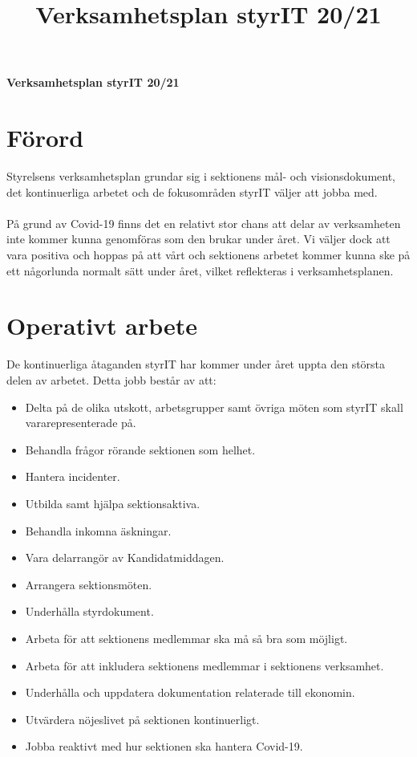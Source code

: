\documentclass[11pt, noincludeaddress, nopagination]{classes/cthit}
\newcommand{\kommitte}{styrIT 20/21}
\begin{document}
\title{Verksamhetsplan \kommitte{}}
\authors{\kommitte}
\makeheadfoot%
\begin{center}
    \Huge{\textbf{Verksamhetsplan \kommitte{} }}
\end{center}


\section{Förord}
Styrelsens verksamhetsplan grundar sig i sektionens mål- och visionsdokument, det kontinuerliga arbetet och de fokusområden styrIT väljer att jobba med.
\\\\
På grund av Covid-19 finns det en relativt stor chans att delar av verksamheten inte kommer kunna genomföras som den brukar under året. Vi väljer dock att vara positiva och hoppas på att vårt och sektionens arbetet kommer kunna ske på ett någorlunda normalt sätt under året, vilket reflekteras i verksamhetsplanen.
\section{Operativt arbete}
De kontinuerliga åtaganden styrIT har kommer under året uppta den största delen av arbetet. Detta jobb består av att:
\begin{itemize}
    \item Delta på de olika utskott, arbetsgrupper samt övriga möten som styrIT skall vararepresenterade på.
    \item Behandla frågor rörande sektionen som helhet.
    \item Hantera incidenter.
    \item Utbilda samt hjälpa sektionsaktiva.
    \item Behandla inkomna äskningar.
    \item Vara delarrangör av Kandidatmiddagen.
    \item Arrangera sektionsmöten.
    \item Underhålla styrdokument.
    \item Arbeta för att sektionens medlemmar ska må så bra som möjligt.
    \item Arbeta för att inkludera sektionens medlemmar i sektionens verksamhet.
    \item Underhålla och uppdatera dokumentation relaterade till ekonomin.
    \item Utvärdera nöjeslivet på sektionen kontinuerligt.
    \item Jobba reaktivt med hur sektionen ska hantera Covid-19. 
\end{itemize}
\end{document}

